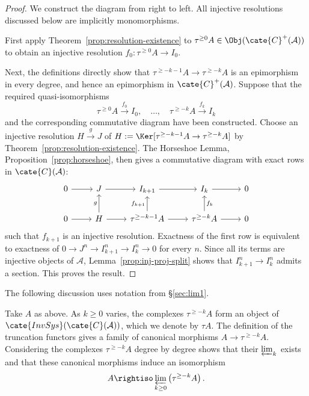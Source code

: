 \begin{proof}
	We construct the diagram from right to left. All injective resolutions
	discussed below are implicitly monomorphisms.

	First apply Theorem~\ref{prop:resolution-existence} to
	$\tau^{\geq0}A\in\Obj(\cate{C}^+(\mathcal{A}))$ to obtain an injective
	resolution $f_0:\tau^{\geq0}A\to I_0$.

	Next, the definitions directly show that
	$\tau^{\geq-k-1}A\to\tau^{\geq-k}A$ is an epimorphism in every degree,
	and hence an epimorphism in $\cate{C}^+(\mathcal{A})$. Suppose that the
	required quasi-isomorphisms
	\[
	\tau^{\geq0}A\xrightarrow{f_0}I_0,\quad\ldots,\quad
	\tau^{\geq-k}A\xrightarrow{f_k}I_k
	\]
	and the corresponding commutative diagram have been constructed. Choose
	an injective resolution $H\xrightarrow{g}J$ of
	$H:=\Ker[\tau^{\geq-k-1}A\to\tau^{\geq-k}A]$ by
	Theorem~\ref{prop:resolution-existence}. The
	Horseshoe Lemma, Proposition~\ref{prop:horseshoe}, then gives a
	commutative diagram with exact rows in $\cate{C}(\mathcal{A})$:
	\[\begin{tikzcd}
		0 \arrow[r] & J \arrow[r] & I_{k+1} \arrow[r] & I_k \arrow[r] & 0 \\
		0 \arrow[r] & H \arrow[r] \arrow[u, "g"] &
		\tau^{\geq-k-1}A \arrow[u, "{f_{k+1}}"] \arrow[r] &
		\tau^{\geq-k}A \arrow[r] \arrow[u, "f_k"'] & 0
	\end{tikzcd}\]
	such that $f_{k+1}$ is an injective resolution. Exactness of the first
	row is equivalent to exactness of
	$0\to J^n\to I_{k+1}^n\to I_k^n\to0$ for every $n$. Since all its terms
	are injective objects of $\mathcal{A}$,
	Lemma~\ref{prop:inj-proj-split} shows that
	$I_{k+1}^n\to I_k^n$ admits a section. This proves the result.
\end{proof}

The following discussion uses notation from \S\ref{sec:lim1}.

Take $A$ as above. As $k\geq0$ varies, the complexes
$\tau^{\geq-k}A$ form an object of
$\cate{InvSys}(\cate{C}(\mathcal{A}))$, which we denote by $\tau A$. The
definition of the truncation functors gives a family of canonical morphisms
$A\to\tau^{\geq-k}A$. Considering the complexes
$\tau^{\geq-k}A$ degree by degree shows that their $\varprojlim_k$ exists and
that these canonical morphisms induce an isomorphism
\begin{equation}\label{eqn:A-lim-truncation}
	A \rightiso \varprojlim_{k \geq 0} \left( \tau^{\geq -k} A \right).
\end{equation}

